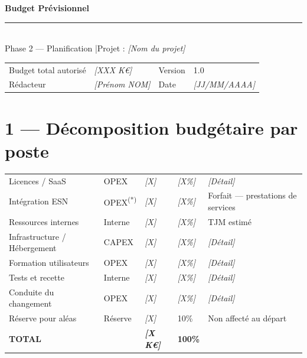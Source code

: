 \documentclass[11pt,a4paper,oneside]{report}
\begin{document}
\small

\begin{center}
{\LARGE\bfseries\color{cnNavy} Budget Prévisionnel}\\[4pt]
\textcolor{cnOrange}{\rule{10cm}{1pt}}\\[4pt]
{\large\color{cnSlate} Phase 2 — Planification \quad|\quad Projet : \textit{[Nom du projet]}}
\end{center}

\vspace{6pt}
\renewcommand{\arraystretch}{1.4}
\begin{tabularx}{\textwidth}{L{3.5cm} Y L{3.5cm} Y}
\toprule
{} &  &  &  \\
\midrule
Budget total autorisé & \textit{[XXX K€]} & Version   & 1.0 \\
Rédacteur             & \textit{[Prénom NOM]} & Date  & \textit{[JJ/MM/AAAA]} \\
\bottomrule
\end{tabularx}

\section*{1 — Décomposition budgétaire par poste}

\renewcommand{\arraystretch}{1.4}
\begin{tabularx}{\textwidth}{L{5cm} C{2.5cm} C{2.5cm} C{2.5cm} Y}
\toprule
{} &  &  &  &  \\
\midrule
Licences / SaaS        & OPEX & \textit{[X]} & \textit{[X\%]} & \textit{[Détail]} \\
Intégration ESN        & OPEX\textsuperscript{(*)} & \textit{[X]} & \textit{[X\%]} & Forfait --- prestations de services \\
Ressources internes    & Interne & \textit{[X]} & \textit{[X\%]} & TJM estimé \\
Infrastructure / Hébergement & CAPEX & \textit{[X]} & \textit{[X\%]} & \textit{[Détail]} \\
Formation utilisateurs & OPEX & \textit{[X]} & \textit{[X\%]} & \textit{[Détail]} \\
Tests et recette       & Interne & \textit{[X]} & \textit{[X\%]} & \textit{[Détail]} \\
Conduite du changement & OPEX & \textit{[X]} & \textit{[X\%]} & \textit{[Détail]} \\
Réserve pour aléas     & Réserve & \textit{[X]} & 10\% & Non affecté au départ \\
\midrule
{}\textbf{TOTAL} & & \textbf{\textit{[X K€]}} & \textbf{100\%} & \\
\bottomrule
\end{tabularx}
\end{document}
